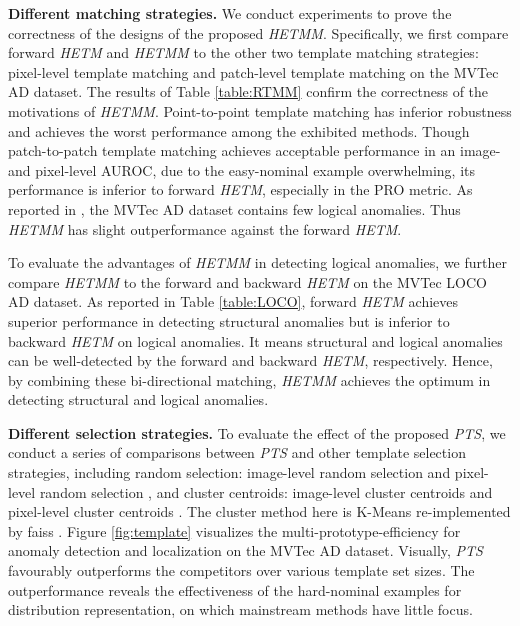\documentclass[default,iicol]{sn-jnl}\usepackage[algo2e,ruled,linesnumbered]{algorithm2e}
\theoremstyle{thmstyleone}\newtheorem{theorem}{Theorem}\newtheorem{proposition}[theorem]{Proposition}
\theoremstyle{thmstyletwo}\newtheorem{example}{Example}\newtheorem{remark}{Remark}
\theoremstyle{thmstylethree}\newtheorem{definition}{Definition}
\begin{document}
\noindent\textbf{Different matching strategies. }
We conduct experiments to prove the correctness of the designs of the proposed \textit{HETMM}.
Specifically, we first compare forward \textit{HETM} and \textit{HETMM} to the other two template matching strategies: pixel-level template matching  and patch-level template matching  on the MVTec AD dataset.
The results of Table \ref{table:RTMM} confirm the correctness of the motivations of \textit{HETMM}.
Point-to-point template matching has inferior robustness and achieves the worst performance among the exhibited methods.
Though patch-to-patch template matching achieves acceptable performance in an image- and pixel-level AUROC, due to the easy-nominal example overwhelming, its performance is inferior to forward \textit{HETM}, especially in the PRO metric.
As reported in \cite{MVTECLOCO}, the MVTec AD dataset contains few logical anomalies. Thus \textit{HETMM} has slight outperformance against the forward \textit{HETM}.

To evaluate the advantages of \textit{HETMM} in detecting logical anomalies, we further compare \textit{HETMM} to the forward and backward \textit{HETM} on the MVTec LOCO AD dataset.
As reported in Table \ref{table:LOCO}, forward \textit{HETM} achieves superior performance in detecting structural anomalies but is inferior to backward \textit{HETM} on logical anomalies.
It means structural and logical anomalies can be well-detected by the forward and backward \textit{HETM}, respectively.
Hence, by combining these bi-directional matching, \textit{HETMM} achieves the optimum in detecting structural and logical anomalies.


\noindent\textbf{Different selection strategies. }
To evaluate the effect of the proposed \textit{PTS}, we conduct a series of comparisons between \textit{PTS} and other template selection strategies, including random selection: image-level random selection  and pixel-level random selection , and cluster centroids: image-level cluster centroids  and pixel-level cluster centroids .
The cluster method here is K-Means \cite{kmeans} re-implemented by faiss \cite{faiss}.
Figure \ref{fig:template} visualizes the multi-prototype-efficiency for anomaly detection and localization on the MVTec AD dataset.
Visually, \textit{PTS} favourably outperforms the competitors over various template set sizes.
The outperformance reveals the effectiveness of the hard-nominal examples for distribution representation, on which mainstream methods have little focus.
\end{document}
